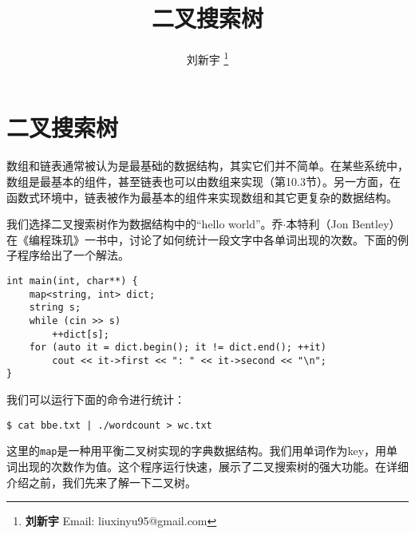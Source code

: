 \documentclass[b5paper]{ctexart}
\begin{document}

\title{二叉搜索树}

\author{刘新宇
\thanks{{\bfseries 刘新宇} \newline
  Email: liuxinyu95@gmail.com \newline}
  }

\maketitle
\fi


\ifx\wholebook\relax
\chapter{二叉搜索树}
\fi


数组和链表通常被认为是最基础的数据结构，其实它们并不简单。在某些系统中，数组是最基本的组件，甚至链表也可以由数组来实现（第10.3节\cite{CLRS}）。另一方面，在函数式环境中，链表被作为最基本的组件来实现数组和其它更复杂的数据结构。

我们选择二叉搜索树作为数据结构中的“hello world”。乔$\cdot$本特利（Jon Bentley）在《编程珠玑》\cite{Bentley}一书中，讨论了如何统计一段文字中各单词出现的次数。下面的例子程序给出了一个解法。

\lstset{language=C++, frame=single}
\begin{lstlisting}
int main(int, char**) {
    map<string, int> dict;
    string s;
    while (cin >> s)
        ++dict[s];
    for (auto it = dict.begin(); it != dict.end(); ++it)
        cout << it->first << ": " << it->second << "\n";
}
\end{lstlisting}

我们可以运行下面的命令进行统计：

\begin{verbatim}
$ cat bbe.txt | ./wordcount > wc.txt
\end{verbatim}

这里的\texttt{map}是一种用平衡二叉树实现的字典数据结构。我们用单词作为key，用单词出现的次数作为值。这个程序运行快速，展示了二叉搜索树的强大功能。在详细介绍之前，我们先来了解一下二叉树。
\end{document}

